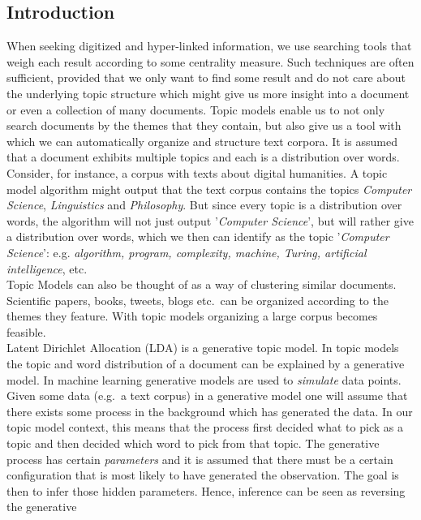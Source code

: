 \documentclass[a4paper,ngerman, english]{atseminar}
\begin{document}
\subsection{Introduction}
When seeking digitized and hyper-linked information, we use searching tools that
weigh each result according to some centrality measure. Such techniques are 
often sufficient, provided that we only want to find some result and do not care
about the underlying topic structure which might give us more insight into a document or
even a collection of many documents.
Topic models enable us to not only search documents by the themes that they contain, but
also give us a tool with which we can automatically organize and structure text corpora.
It is assumed that a document exhibits multiple topics and each 
is a distribution over words. Consider, for instance, a corpus with texts about 
digital humanities. A topic model algorithm might output that the text corpus
contains the topics \textit{Computer Science}, \textit{Linguistics} and \textit{Philosophy}.
But since every topic is a distribution over words, the algorithm will not just output '\textit{Computer Science}', 
but will rather give a distribution over words, which we then can identify as the topic '\textit{Computer Science}':
e.g. \textit{algorithm, program, complexity, machine, Turing, artificial intelligence}, etc.
\\
Topic Models can also be thought of as a way of clustering similar documents.
Scientific papers, books, tweets, blogs etc.~can be organized according to the 
themes they feature. With topic models organizing a large corpus becomes feasible. \\
Latent Dirichlet Allocation (LDA) is a generative topic model.
In topic models the topic and word distribution of a document can be explained by a generative
model. In machine learning generative models are used to \textit{simulate} data points.
Given some data (e.g.~a text corpus) in a generative model one will assume that 
there exists some process in the background which has generated the data. In our topic model context, this
means that the process first decided what to pick as a topic and then decided which word to pick 
from that topic. The generative process has certain \textit{parameters} and it is assumed that there must be a certain configuration that is most likely to have generated the observation.
The goal is then to infer those hidden parameters. Hence, inference can be seen as reversing the generative 
\end{document}
